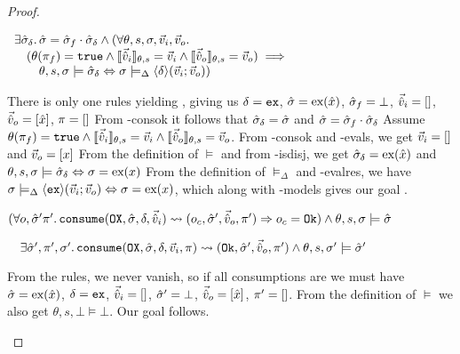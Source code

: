 \begin{proof}

\pfassume \begin{hypvlist}
 
\end{hypvlist}
\pfprove \begin{goalvlist}
 $\begin{array}{l}
\exists \hat{\sigma}_\delta\ldotp \hat{\sigma}=\hat{\sigma}_f\cdot\hat{\sigma}_\delta\land (\forall\theta,s,\sigma,\vec{v}_i,\vec{v}_o\ldotp \\
\quad (\theta(\pi_f)=\texttt{true} \land \llbracket\vec{\hat{v}}_i\rrbracket_{\theta,s} = \vec{v}_i \land \llbracket\vec{\hat{v}}_o\rrbracket_{\theta,s}=\vec{v}_o) \implies\\
\qquad \theta,s,\sigma\models \hat{\sigma}_\delta \Leftrightarrow \sigma \models_\Delta \left<\delta\right>\!(\vec{v}_i;\vec{v}_o))
\end{array}$
\end{goalvlist}
\begin{hypvlist}
 There is only one \consume{} rules yielding \Ok, giving us $\delta=\texttt{ex}$, $\hat{\sigma}=\text{ex}(\hat{x})$, $\hat{\sigma}_f=\bot$, $\vec{\hat{v}}_i=[]$, $\vec{\hat{v}}_o=[\hat{x}]$, $\pi=[]$
 From \hyp{consok} it follows that $\hat{\sigma}_\delta=\hat{\sigma}$ and $\hat{\sigma}=\hat{\sigma}_f\cdot\hat{\sigma}_\delta$
 Assume $\theta(\pi_f)=\texttt{true} \land \llbracket\vec{\hat{v}}_i\rrbracket_{\theta,s} = \vec{v}_i \land \llbracket\vec{\hat{v}}_o\rrbracket_{\theta,s}=\vec{v}_o$.
 From \hyp{consok} and \hyp{evals}, we get $\vec{v}_i=[]$ and $\vec{v}_o=[x]$
 From the definition of $\models$ and from \hyp{isdisj}, we get $\hat{\sigma}_\delta=\text{ex}(\hat{x})$ and ${\theta,s,\sigma\models\hat{\sigma}_\delta} \Leftrightarrow {\sigma=\text{ex}(x)}$
 From the definition of $\models_\Delta$ and \hyp{evalres}, we have $\sigma\models_\Delta\left<\texttt{ex}\right>\!(\vec{v}_i;\vec{v}_o)\Leftrightarrow \sigma=\text{ex}(x)$, which along with \hyp{models} gives our goal .
\end{hypvlist}


\pfassume \begin{hypvlist}
 $(\forall o, \hat{\sigma}'\pi'\ldotp \texttt{consume}(\texttt{OX},\hat{\sigma},\delta,\vec{\hat{v}}_i)\rightsquigarrow (o_c, \hat{\sigma}', \vec{\hat{v}}_o, \pi')\Rightarrow o_c = \texttt{Ok})\land \theta, s, \sigma \models \hat{\sigma}$
\end{hypvlist}
\pfprove \begin{goalvlist}
 $\quad \exists  \hat{\sigma}', \pi', \sigma'\ldotp \texttt{consume}(\texttt{OX}, \hat{\sigma}, \delta,\vec{v}_i,\pi)\rightsquigarrow (\texttt{Ok}, \hat{\sigma}', \vec{\hat{v}}_o, \pi') \land \theta,s,\sigma' \models \hat{\sigma}'$
\end{goalvlist}
\begin{hypvlist}
 From the \consume{} rules, we never vanish, so if all consumptions are \Ok{} we must have $\hat{\sigma}=\text{ex}(\hat{x})$, $\delta=\texttt{ex}$, $\vec{\hat{v}}_i=[]$, $\hat{\sigma}'=\bot$, $\vec{\hat{v}}_o=[\hat{x}]$, $\pi'=[]$.
 From the definition of $\models$ we also get $\theta,s,\bot\models\bot$. Our goal  follows.
\end{hypvlist}


\end{proof}
